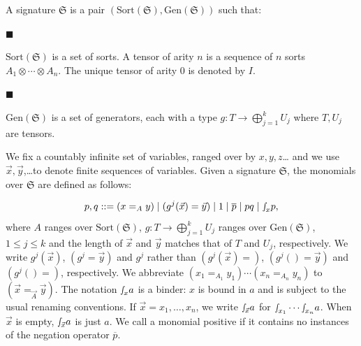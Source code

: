\documentclass[10pt,a4paper]{amsart}
\begin{document}
A signature $\mathfrak{S}$ is a pair $(\mathrm{Sort}(\mathfrak{S}),\mathrm{Gen}(\mathfrak{S}))$ such that:\par
  
\par\noindent  $\blacksquare$ 
 
$\mathrm{Sort}(\mathfrak{S})$ is a set of sorts. A tensor of arity $n$ is a sequence of $n$ sorts $A_{1}\otimes\cdots\otimes A_{n}$. The unique tensor of arity $0$ is denoted by $I$.\par
 
 
 
\par\noindent  $\blacksquare$ 
 
$\mathrm{Gen}(\mathfrak{S})$ is a set of generators, each with a type $g:T\to\bigoplus_{j=1}^{k}U_{j}$ where $T,U_{j}$ are tensors.\par
 
 
  
 
 
 
We fix a countably infinite set of variables, ranged over by $x,y,z$… and we use $\vec{x},\vec{y}$,…to denote finite sequences of variables. Given a signature $\mathfrak{S}$, the monomials over $\mathfrak{S}$ are defined as follows:\par
    \[p,q::=(x=_{A}y)\mathrel{|}(g^{j}(\vec{x})=\vec{y})\mathrel{|}1\mathrel{|}%
\overline{p}\mathrel{|}pq\mathrel{|}{\smallint\!}_{x}p,\]    
where $A$ ranges over $\mathrm{Sort}(\mathfrak{S})$, $g:T\to\bigoplus_{j=1}^{k}U_{j}$ ranges over $\mathrm{Gen}(\mathfrak{S})$, $1\leq j\leq k$ and the length of $\vec{x}$ and $\vec{y}$ matches that of $T$ and $U_{j}$, respectively. We write $g^{j}(\vec{x})$, $(g^{j}=\vec{y})$ and $g^{j}$ rather than $(g^{j}(\vec{x})=)$, $(g^{j}()=\vec{y})$ and $(g^{j}()=)$, respectively. We abbreviate $(x_{1}=_{A_{1}}y_{1})\cdots(x_{n}=_{A_{n}}y_{n})$ to $(\vec{x}=_{\vec{A}}\vec{y})$. The notation ${\smallint\!}_{x}a$ is a binder: $x$ is bound in $a$ and is subject to the usual renaming conventions. If $\vec{x}=x_{1},\ldots,x_{n}$, we write ${\smallint\!}_{\vec{x}}a$ for ${\smallint\!}_{x_{1}}\cdots{\smallint\!}_{x_{n}}a$. When $\vec{x}$ is empty, ${\smallint\!}_{\vec{x}}a$ is just $a$. We call a monomial positive if it contains no instances of the negation operator $\overline{p}$.\par
 
\end{document}
